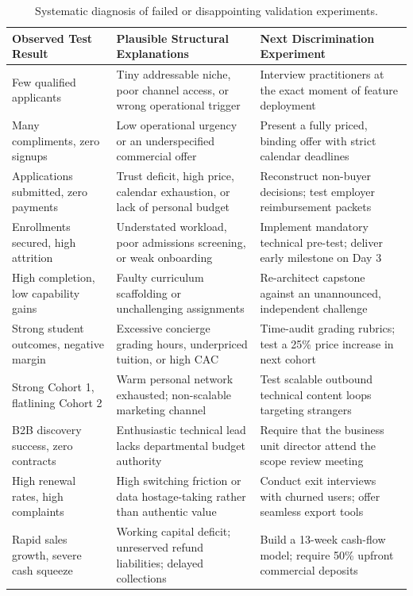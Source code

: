 \begin{table}[t]
\centering
\small
\begin{tabularx}{\textwidth}{>{\raggedright\arraybackslash}p{4cm} >{\raggedright\arraybackslash}p{5cm} >{\raggedright\arraybackslash}X}
\toprule
\textbf{Observed Test Result} & \textbf{Plausible Structural Explanations} & \textbf{Next Discrimination Experiment} \\
\midrule
Few qualified applicants & Tiny addressable niche, poor channel access, or wrong operational trigger & Interview practitioners at the exact moment of feature deployment \\
Many compliments, zero signups & Low operational urgency or an underspecified commercial offer & Present a fully priced, binding offer with strict calendar deadlines \\
Applications submitted, zero payments & Trust deficit, high price, calendar exhaustion, or lack of personal budget & Reconstruct non-buyer decisions; test employer reimbursement packets \\
Enrollments secured, high attrition & Understated workload, poor admissions screening, or weak onboarding & Implement mandatory technical pre-test; deliver early milestone on Day 3 \\
High completion, low capability gains & Faulty curriculum scaffolding or unchallenging assignments & Re-architect capstone against an unannounced, independent challenge \\
Strong student outcomes, negative margin & Excessive concierge grading hours, underpriced tuition, or high CAC & Time-audit grading rubrics; test a 25\% price increase in next cohort \\
Strong Cohort 1, flatlining Cohort 2 & Warm personal network exhausted; non-scalable marketing channel & Test scalable outbound technical content loops targeting strangers \\
B2B discovery success, zero contracts & Enthusiastic technical lead lacks departmental budget authority & Require that the business unit director attend the scope review meeting \\
High renewal rates, high complaints & High switching friction or data hostage-taking rather than authentic value & Conduct exit interviews with churned users; offer seamless export tools \\
Rapid sales growth, severe cash squeeze & Working capital deficit; unreserved refund liabilities; delayed collections & Build a 13-week cash-flow model; require 50\% upfront commercial deposits \\
\bottomrule
\end{tabularx}
\caption{Systematic diagnosis of failed or disappointing validation experiments.}
\label{tab:ch9-app-diagnosing-results}
\end{table}

